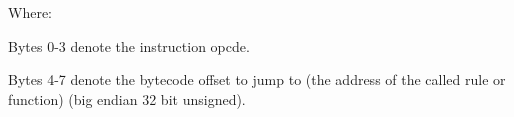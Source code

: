 Where:

Bytes 0-3 denote the instruction opcde.

Bytes 4-7 denote the bytecode offset to jump to
(the address of the called rule or function)
(big endian 32 bit unsigned).
